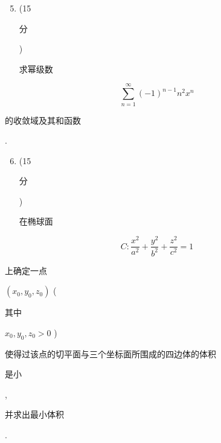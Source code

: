 \documentclass[10pt]{article}
\begin{document}
\begin{enumerate}
  \setcounter{enumi}{4}
  \item (15 \begin{CJK}{UTF8}{mj}分\end{CJK}) \begin{CJK}{UTF8}{mj}求幂级数\end{CJK}
\end{enumerate}
$$
\sum_{n=1}^{\infty}(-1)^{n-1} n^{2} x^{n}
$$
\begin{CJK}{UTF8}{mj}的收敛域及其和函数\end{CJK}.

\begin{enumerate}
  \setcounter{enumi}{5}
  \item (15 \begin{CJK}{UTF8}{mj}分\end{CJK}) \begin{CJK}{UTF8}{mj}在椭球面\end{CJK}
\end{enumerate}
$$
C: \frac{x^{2}}{a^{2}}+\frac{y^{2}}{b^{2}}+\frac{z^{2}}{c^{2}}=1
$$
\begin{CJK}{UTF8}{mj}上确定一点\end{CJK} $\left(x_{0}, y_{0}, z_{0}\right)$ (\begin{CJK}{UTF8}{mj}其中\end{CJK} $x_{0}, y_{0}, z_{0}>0$ ) \begin{CJK}{UTF8}{mj}使得过该点的切平面与三个坐标面所围成的四边体的体积\end{CJK} \begin{CJK}{UTF8}{mj}是小\end{CJK}, \begin{CJK}{UTF8}{mj}并求出最小体积\end{CJK}.
\end{document}
